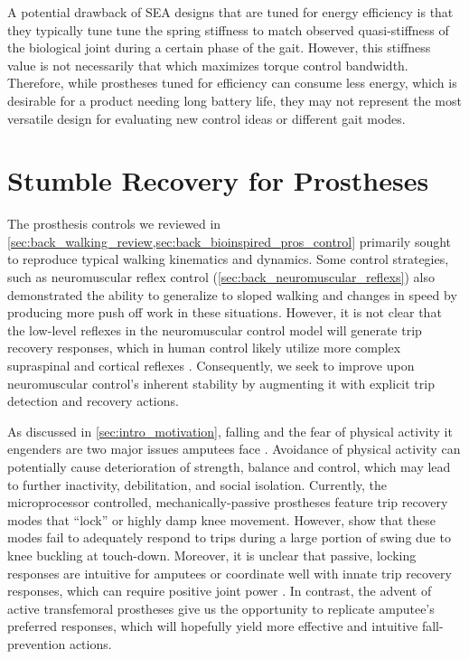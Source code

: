 A potential drawback of SEA designs that are tuned for energy efficiency is that
they typically tune tune the spring stiffness to match observed quasi-stiffness
of the biological joint during a certain phase of the gait. However, this
stiffness value is not necessarily that which maximizes torque control
bandwidth. Therefore, while prostheses tuned for efficiency can consume less
energy, which is desirable for a product needing long battery life, they may
not represent the most versatile design for evaluating new control ideas or
different gait modes. 

\section{Stumble Recovery for Prostheses}\label{sec:back_stumble_recovery}
The prosthesis controls we reviewed in
\cref{sec:back_walking_review,sec:back_bioinspired_pros_control} primarily
sought to reproduce typical walking kinematics and dynamics. Some control
strategies, such as neuromuscular reflex control
(\cref{sec:back_neuromuscular_reflexs}) also demonstrated the ability to
generalize to sloped walking and changes in speed by producing more push off
work in these situations\citep{eilenberg2010control, markowitz2011speed}.
However, it is not clear that the low-level reflexes in the neuromuscular
control model will generate trip recovery responses, which in human control
likely utilize more complex supraspinal and cortical reflexes
\citep{eng1994strategies, schillings2000muscular, hofstad2009evidence}.
Consequently, we seek to improve upon neuromuscular control's inherent stability
by augmenting it with explicit trip detection and recovery actions.

As discussed in \cref{sec:intro_motivation}, falling and the fear of physical
activity it engenders are two major issues amputees face
\citep{miller2001prevalence}. Avoidance of physical activity can potentially
cause deterioration of strength, balance and control, which may lead to further
inactivity, debilitation, and social isolation. Currently, the microprocessor
controlled, mechanically-passive prostheses feature trip recovery modes
that ``lock'' or highly damp knee movement. However,
\citet{bellmann2010comparative} show that these modes fail to adequately respond
to trips during a large portion of swing due to knee buckling at touch-down.
Moreover, it is unclear that passive, locking responses are intuitive for
amputees or coordinate well with innate trip recovery responses, which can
require positive joint power \citep{cordero2005energy}. In contrast, the advent
of active transfemoral prostheses give us the opportunity to replicate amputee's
preferred responses, which will hopefully yield more effective and intuitive
fall-prevention actions.

